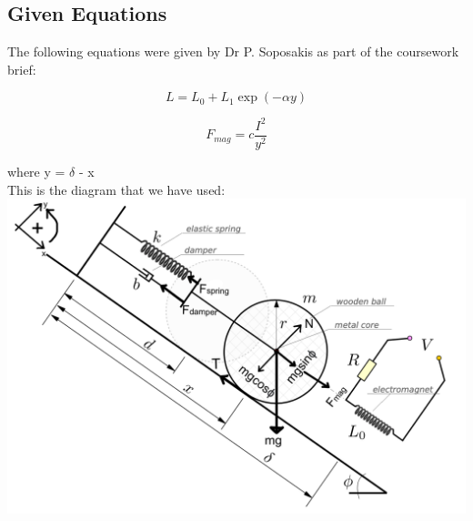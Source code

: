 \subsection*{Given Equations} The following equations were given by Dr P. Soposakis as part of the coursework brief:

\begin{equation} \label{eq:1}
    L = L_0 + L_1 \exp{(-\alpha y)}
\end{equation}

\begin{equation} \label{eq:2}
    F_{mag}=c \frac{I^2}{y^2}
\end{equation}

  \hspace{6cm} where y = $\delta$ - x \\
This is the diagram that we have used:\\
\includegraphics[scale=0.6]{Report/figures/main_diagram}